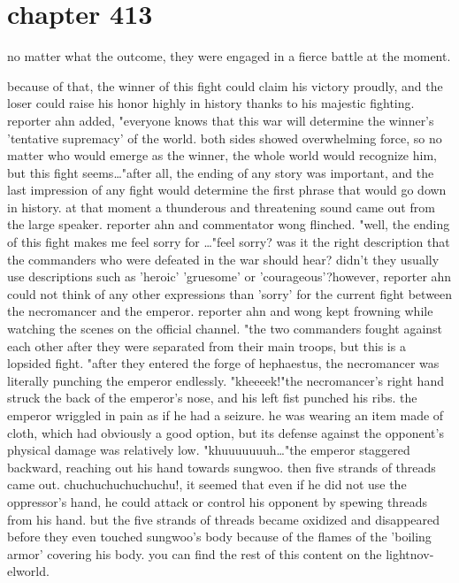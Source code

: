 \section{chapter 413}

no matter what the outcome, they were engaged in a fierce battle at the moment.





because of that, the winner of this fight could claim his victory proudly, and the loser could raise his honor highly in history thanks to his majestic fighting.
reporter ahn added, "everyone knows that this war will determine the winner's 'tentative supremacy' of the world.
 both sides showed overwhelming force, so no matter who would emerge as the winner, the whole world would recognize him, but this fight seems…"after all, the ending of any story was important, and the last impression of any fight would determine the first phrase that would go down in history.
at that moment a thunderous and threatening sound came out from the large speaker.
reporter ahn and commentator wong flinched.
"well, the ending of this fight makes me feel sorry for …"feel sorry? was it the right description that the commanders who were defeated in the war should hear? didn't they usually use descriptions such as 'heroic' 'gruesome' or 'courageous'?however, reporter ahn could not think of any other expressions than 'sorry' for the current fight between the necromancer and the emperor.
reporter ahn and wong kept frowning while watching the scenes on the official channel.
"the two commanders fought against each other after they were separated from their main troops, but this is a lopsided fight.
"after they entered the forge of hephaestus, the necromancer was literally punching the emperor endlessly.
"kheeeek!"the necromancer's right hand struck the back of the emperor's nose, and his left fist punched his ribs.
 the emperor wriggled in pain as if he had a seizure.
 he was wearing an item made of cloth, which had obviously a good option, but its defense against the opponent's physical damage was relatively low.
"khuuuuuuuh…"the emperor staggered backward, reaching out his hand towards sungwoo.
then five strands of threads came out.
chuchuchuchuchuchu!,
it seemed that even if he did not use the oppressor's hand, he could attack or control his opponent by spewing threads from his hand.
but the five strands of threads became oxidized and disappeared before they even touched sungwoo's body because of the flames of the 'boiling armor' covering his body.
you can find the rest of this content on the lightnov­elworld.
